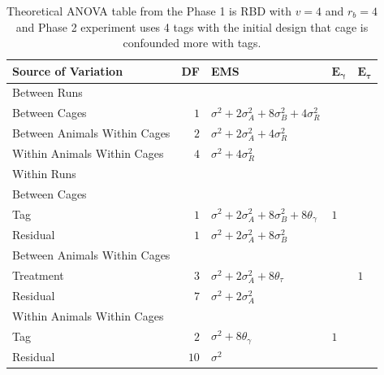 \documentclass[12pt,a4paper]{article}
\begin{document}
\begin{table}[ht]
\centering
 \caption{Theoretical ANOVA table from the Phase 1 is RBD with $v = 4$ and $r_b = 4$ and Phase 2 experiment uses 4 tags with the initial design that cage is confounded more with tags.}
 \begin{tabular}[t]{lrlll} 
 \toprule 
 \multicolumn{1}{l}{\textbf{Source of Variation}} & \multicolumn{1}{l}{\textbf{DF}} & \multicolumn{1}{l}{\textbf{EMS}}& \multicolumn{1}{l}{$\bm{E_{\gamma}}$}&\multicolumn{1}{l}{$\bm{E_{\tau}}$}\\ 
 \midrule 
 Between Runs &  &  & & \\ 
 \quad Between Cages & $1$ & $\sigma^2+2\sigma_{A}^2+8\sigma_{B}^2+4\sigma_{R}^2$ & & \\  
 \quad Between Animals Within Cages & $2$ & $\sigma^2+2\sigma_{A}^2+4\sigma_{R}^2$ & & \\  
 \quad Within Animals Within Cages & $4$ & $\sigma^2+4\sigma_{R}^2$ & & \\ \hline 
 Within Runs &  &  & & \\ 
 \quad Between Cages &  &  & & \\ 
 \quad \quad Tag & $1$ & $\sigma^2+2\sigma_{A}^2+8\sigma_{B}^2+8\theta_{\gamma}$ &$1$ & \\ 
 \quad \quad Residual & $1$ & $\sigma^2+2\sigma_{A}^2+8\sigma_{B}^2$ & & \\ \hline 
 \quad Between Animals Within Cages &  &  & & \\ 
 \quad \quad Treatment & $3$ & $\sigma^2+2\sigma_{A}^2+8\theta_{\tau}$ & & $1$\\ 
 \quad \quad Residual & $7$ & $\sigma^2+2\sigma_{A}^2$ & & \\ \hline 
 \quad Within Animals Within Cages &  &  & & \\ 
 \quad \quad Tag & $2$ & $\sigma^2+8\theta_{\gamma}$ &$1$ & \\ 
 \quad \quad Residual & $10$ & $\sigma^2$ & & \\ 
 \bottomrule 
 \end{tabular} 
 \label{tab:ANOVAPhase1RBD2} 
\end{table} 
\end{document}
